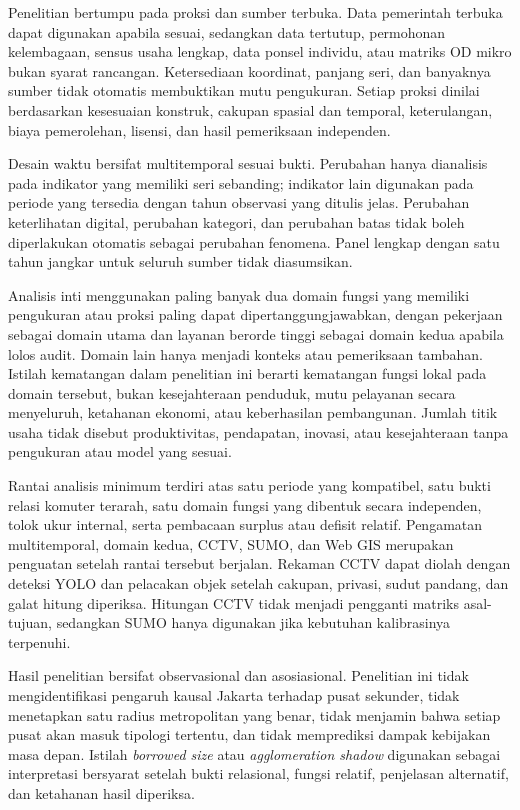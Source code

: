 \documentclass[11pt,a4paper,oneside,openany,indonesian]{report}
\begin{document}
Penelitian bertumpu pada proksi dan sumber terbuka. Data pemerintah terbuka dapat digunakan apabila sesuai, sedangkan data tertutup, permohonan kelembagaan, sensus usaha lengkap, data ponsel individu, atau matriks OD mikro bukan syarat rancangan. Ketersediaan koordinat, panjang seri, dan banyaknya sumber tidak otomatis membuktikan mutu pengukuran. Setiap proksi dinilai berdasarkan kesesuaian konstruk, cakupan spasial dan temporal, keterulangan, biaya pemerolehan, lisensi, dan hasil pemeriksaan independen.

Desain waktu bersifat multitemporal sesuai bukti. Perubahan hanya dianalisis pada indikator yang memiliki seri sebanding; indikator lain digunakan pada periode yang tersedia dengan tahun observasi yang ditulis jelas. Perubahan keterlihatan digital, perubahan kategori, dan perubahan batas tidak boleh diperlakukan otomatis sebagai perubahan fenomena. Panel lengkap dengan satu tahun jangkar untuk seluruh sumber tidak diasumsikan.

Analisis inti menggunakan paling banyak dua domain fungsi yang memiliki pengukuran atau proksi paling dapat dipertanggungjawabkan, dengan pekerjaan sebagai domain utama dan layanan berorde tinggi sebagai domain kedua apabila lolos audit. Domain lain hanya menjadi konteks atau pemeriksaan tambahan. Istilah kematangan dalam penelitian ini berarti kematangan fungsi lokal pada domain tersebut, bukan kesejahteraan penduduk, mutu pelayanan secara menyeluruh, ketahanan ekonomi, atau keberhasilan pembangunan. Jumlah titik usaha tidak disebut produktivitas, pendapatan, inovasi, atau kesejahteraan tanpa pengukuran atau model yang sesuai.

Rantai analisis minimum terdiri atas satu periode yang kompatibel, satu bukti relasi komuter terarah, satu domain fungsi yang dibentuk secara independen, tolok ukur internal, serta pembacaan surplus atau defisit relatif. Pengamatan multitemporal, domain kedua, CCTV, SUMO, dan Web GIS merupakan penguatan setelah rantai tersebut berjalan. Rekaman CCTV dapat diolah dengan deteksi YOLO dan pelacakan objek setelah cakupan, privasi, sudut pandang, dan galat hitung diperiksa. Hitungan CCTV tidak menjadi pengganti matriks asal-tujuan, sedangkan SUMO hanya digunakan jika kebutuhan kalibrasinya terpenuhi.

Hasil penelitian bersifat observasional dan asosiasional. Penelitian ini tidak mengidentifikasi pengaruh kausal Jakarta terhadap pusat sekunder, tidak menetapkan satu radius metropolitan yang benar, tidak menjamin bahwa setiap pusat akan masuk tipologi tertentu, dan tidak memprediksi dampak kebijakan masa depan. Istilah \emph{borrowed size} atau \emph{agglomeration shadow} digunakan sebagai interpretasi bersyarat setelah bukti relasional, fungsi relatif, penjelasan alternatif, dan ketahanan hasil diperiksa.
\end{document}
